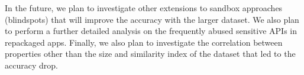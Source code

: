 In the future, we plan to investigate other extensions to sandbox approaches (blindspots) that will improve the accuracy with the larger dataset. We also plan to perform a further detailed analysis on the frequently abused sensitive APIs in repackaged apps. Finally, we also plan to investigate the correlation between properties other than the size and similarity index of the dataset that led to the accuracy drop. 

\begin{comment}
In this paper, we conducted a study in which we observed the accuracy result, in terms of malware detection, of the state of the art mining sandbox approach. In our experiment, we used the test generator tool Droidbot to explore sensitive APIs called by malware at a real-word dataset of $800$, containing more representative samples than previous works. Our results demonstrated that the accuracy of Droidbot for malware detection drops to $24.12\%$ when we compare it with previous works, which explored a smaller sample. This first experiment also helps us to conclude that only a few sensitive APIs are responsible for most injected malware code at our repackaged sample.

These results encourage us to investigate how we could improve the mine sandbox approach. Hence, we investigated how relevant a dynamic call graph analysis and a simple manifest files analysis are to improving malware detection in the mine sandbox approach. Our investigation present relevant findings. First, with dynamic call graph analysis, we find that its possible to improve malware detection, if we consider trace analysis as a factor. Moreover, we present that a simple static analysis of manifest files also improves malware detection, complementing even the dynamic call graph analysis in terms of malware detection.

Our finds provide possible future research directions to further improve the mine sandbox approach. As future work, we plan to investigate if the distance at a dynamic call graph, between the Android app entry point and a call for a sensitive API has influence on the accuracy rate of malware detection at mine Android sandbox. We also plan to investigate the hypothesis that the test tool coverage used at mine Android Sandbox, can further benefit the approach since it provide more traces at dynamic call graph to inspect. Finally, we plan understand which are the malware features present at our dataset, that led accuracy of sandboxes approach drop significantly, when compared with previous work.
\end{comment}